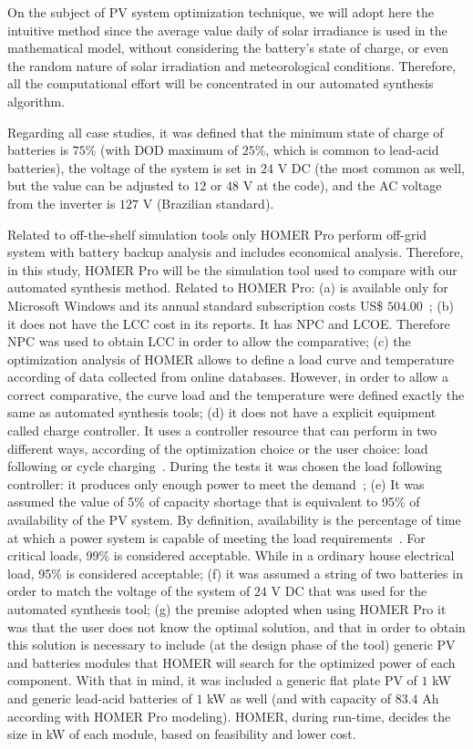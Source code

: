 \documentclass[journal]{IEEEtran}
\begin{document}
On the subject of PV system optimization technique, we will adopt here the intuitive method 
since the average value daily of solar irradiance is used in the mathematical model, 
without considering the battery's state of charge, or even the random nature 
of solar irradiation and meteorological conditions. Therefore, all the computational 
effort will be concentrated in our automated synthesis algorithm.

Regarding all case studies, it was defined that the minimum state of charge of batteries is $75$\% (with DOD maximum of $25$\%, which is common to lead-acid batteries), the voltage of the system is set in $24$ V DC (the most common as well, but the value can be adjusted to $12$ or $48$ V at the code), and the AC voltage from the inverter is $127$ V (Brazilian standard).

Related to off-the-shelf simulation tools only HOMER Pro perform off-grid system with battery backup analysis and includes economical analysis. Therefore, in this study, HOMER Pro will be the simulation tool used to compare with our automated synthesis method.  Related to HOMER Pro: (a) is available only for Microsoft Windows and its annual standard subscription costs US\$ $504.00$~\cite{HOMER}; (b) it does not have the LCC cost in its reports. It has NPC and LCOE. Therefore NPC was used to obtain LCC in order to allow the comparative; (c) the optimization analysis of HOMER allows to define a load curve and temperature according of data collected from online databases. However, in order to allow a correct comparative, the curve load and the temperature were defined exactly the same as automated synthesis tools; (d) it does not have a explicit equipment called charge controller. It uses a controller resource that can perform in two different ways, according of the optimization choice or the user choice: load following or cycle charging~\cite{HOMER}. During the tests it was chosen the load following controller: it produces only enough power to meet the demand~\cite{HOMER}; (e) It was assumed the value of 5\% of capacity shortage that is equivalent to 95\% of availability of the PV system. By definition, availability is the percentage of time at which a power system is capable of meeting the load requirements~\cite{Khatib2014}. For critical loads, 99\% is considered acceptable. While in a ordinary house electrical load, 95\% is considered acceptable; (f) it was assumed a string of two batteries in order to match the voltage of the system of $24$ V DC that was used for the automated synthesis tool; (g) the premise adopted when using HOMER Pro it was that the user does not know the optimal solution, and that in order to obtain this solution is necessary to include (at the design phase of the tool) generic PV and batteries modules that HOMER will search for the optimized power of each component. With that in mind, it was included a generic flat plate PV of $1$ kW and generic lead-acid batteries of $1$ kW as well (and with capacity of $83.4$ Ah according with HOMER Pro modeling). HOMER, during run-time, decides the size in kW of each module, based on feasibility and lower cost.
\end{document}
